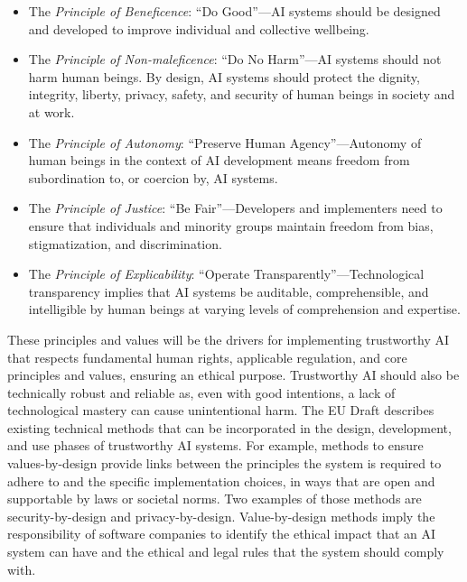\begin{itemize}
\item The \textit{Principle of Beneficence}: ``Do Good''---AI systems should be designed and developed to improve individual and collective wellbeing.
\item The \textit{Principle of Non-maleficence}: ``Do No Harm''---AI systems should not harm human beings. By design, AI systems should protect the dignity, integrity, liberty, privacy, safety, and security of human beings in society and at work.
\item The \textit{Principle of Autonomy}: ``Preserve Human Agency''---Autonomy of human beings in the context of AI development means freedom from subordination to, or coercion by, AI systems.
\item The \textit{Principle of Justice}: ``Be Fair''---Developers and implementers need to ensure that individuals and minority groups maintain freedom from bias, stigmatization, and discrimination.
\item The \textit{Principle of Explicability}: ``Operate
Transparently''---Technological transparency implies that AI systems be auditable, comprehensible, and intelligible by human beings at varying levels of comprehension and expertise.
\end{itemize}

These principles and values will be the drivers for implementing trustworthy AI that respects fundamental human rights, applicable regulation, and core principles and values, ensuring an ethical purpose. Trustworthy AI should also be technically robust and reliable as, even with good intentions, a lack of technological mastery can cause unintentional harm. The EU Draft describes existing technical methods that can be incorporated in the design, development, and use phases of trustworthy AI systems. For example, methods to ensure values-by-design provide links between the principles the system is required to adhere to and the specific implementation choices, in ways that are open and supportable by laws or societal norms. Two examples of those methods are security-by-design and privacy-by-design. Value-by-design methods imply the responsibility of software companies to identify the ethical impact that an AI system can have and the ethical and legal rules that the system should comply with.

